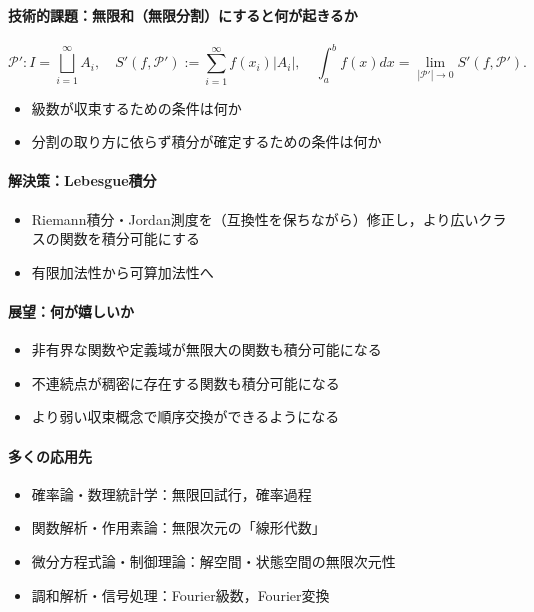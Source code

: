 \paragraph{技術的課題：無限和（無限分割）にすると何が起きるか}
\[
\mathcal P' : I=\bigsqcup_{i=1}^\infty A_i, \quad 
S'(f,\mathcal P'):=\sum_{i=1}^\infty f(x_i) |A_i|, \quad \int_a^b f(x) dx = \lim_{|\mathcal P'| \to 0} S'(f,\mathcal P').
\]
\begin{itemize}
    \item 級数が収束するための条件は何か
    \item 分割の取り方に依らず積分が確定するための条件は何か
\end{itemize}

\paragraph{解決策：Lebesgue積分}

\begin{itemize}
    \item Riemann積分・Jordan測度を（互換性を保ちながら）修正し，より広いクラスの関数を積分可能にする
    \item 有限加法性から可算加法性へ
\end{itemize}

\paragraph{展望：何が嬉しいか}
\begin{itemize}
    \item 非有界な関数や定義域が無限大の関数も積分可能になる
    \item 不連続点が稠密に存在する関数も積分可能になる
    \item より弱い収束概念で順序交換ができるようになる
\end{itemize}

\paragraph{多くの応用先}
\begin{itemize}
    \item 確率論・数理統計学：無限回試行，確率過程
    \item 関数解析・作用素論：無限次元の「線形代数」
    \item 微分方程式論・制御理論：解空間・状態空間の無限次元性
    \item 調和解析・信号処理：Fourier級数，Fourier変換
\end{itemize}

